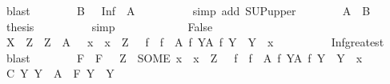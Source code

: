 \begin{isabellebody}
\ blast\isanewline
\ \ \ \ \ \ \isamarkupfalse%
\ B{\isacharcolon}{\kern0pt}\ {\isachardoublequoteopen}{\isachardot}{\kern0pt}{\isachardot}{\kern0pt}{\isachardot}{\kern0pt}\ {\isasymle}\ {\isasymSqunion}{\isacharparenleft}{\kern0pt}Inf\ {\isacharbackquote}{\kern0pt}\ A{\isacharparenright}{\kern0pt}{\isachardoublequoteclose}\isanewline
\ \ \ \ \ \ \ \ \isamarkupfalse%
\ {\isacharparenleft}{\kern0pt}simp\ add{\isacharcolon}{\kern0pt}\ SUP{\isacharunderscore}{\kern0pt}upper{\isacharparenright}{\kern0pt}\isanewline
\ \ \ \ \ \ \isamarkupfalse%
\ A\ \ B\ \isamarkupfalse%
\ {\isacharquery}{\kern0pt}thesis\isanewline
\ \ \ \ \ \ \ \ \isamarkupfalse%
\ simp\isanewline
\ \ \ \ \isamarkupfalse%
\isanewline
\ \ \ \ \ \ \isamarkupfalse%
\ False\isanewline
\ \ \ \ \ \ \isamarkupfalse%
\ \isamarkupfalse%
\ X{\isacharcolon}{\kern0pt}\ {\isachardoublequoteopen}{\isasymAnd}\ Z\ {\isachardot}{\kern0pt}\ Z\ {\isasymin}\ A\ {\isasymLongrightarrow}\ {\isasymexists}\ x\ {\isachardot}{\kern0pt}\ x\ {\isasymin}\ Z\ {\isasymand}\ {\isasymnot}\ {\isasymSqinter}{\isacharparenleft}{\kern0pt}f\ {\isacharbackquote}{\kern0pt}\ {\isacharbraceleft}{\kern0pt}f\ {\isacharbackquote}{\kern0pt}\ A\ {\isacharbar}{\kern0pt}f{\isachardot}{\kern0pt}\ {\isasymforall}Y{\isasymin}A{\isachardot}{\kern0pt}\ f\ Y\ {\isasymin}\ Y{\isacharbraceright}{\kern0pt}{\isacharparenright}{\kern0pt}\ {\isasymle}\ x{\isachardoublequoteclose}\isanewline
\ \ \ \ \ \ \ \ \isamarkupfalse%
\ Inf{\isacharunderscore}{\kern0pt}greatest\ \isamarkupfalse%
\ blast\isanewline
\ \ \ \ \ \ \isamarkupfalse%
\ F\ \ {\isachardoublequoteopen}F\ {\isacharequal}{\kern0pt}\ {\isacharparenleft}{\kern0pt}{\isasymlambda}\ Z\ {\isachardot}{\kern0pt}\ SOME\ x\ {\isachardot}{\kern0pt}\ x\ {\isasymin}\ Z\ {\isasymand}\ {\isasymnot}\ {\isasymSqinter}{\isacharparenleft}{\kern0pt}f\ {\isacharbackquote}{\kern0pt}\ {\isacharbraceleft}{\kern0pt}f\ {\isacharbackquote}{\kern0pt}\ A\ {\isacharbar}{\kern0pt}f{\isachardot}{\kern0pt}\ {\isasymforall}Y{\isasymin}A{\isachardot}{\kern0pt}\ f\ Y\ {\isasymin}\ Y{\isacharbraceright}{\kern0pt}{\isacharparenright}{\kern0pt}\ {\isasymle}\ x{\isacharparenright}{\kern0pt}{\isachardoublequoteclose}\isanewline
\ \ \ \ \ \ \isamarkupfalse%
\ C{\isacharcolon}{\kern0pt}\ {\isachardoublequoteopen}{\isasymAnd}Y{\isachardot}{\kern0pt}\ Y\ {\isasymin}\ A\ {\isasymLongrightarrow}\ F\ Y\ {\isasymin}\ Y{\isachardoublequoteclose}\isanewline

\end{isabellebody}
